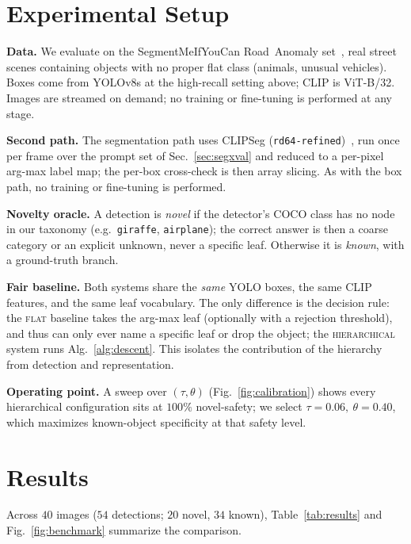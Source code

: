 \documentclass[conference]{IEEEtran}
\begin{document}
\section{Experimental Setup}
\label{sec:setup}

\textbf{Data.} We evaluate on the SegmentMeIfYouCan Road~Anomaly
set~\cite{chan2021}, real street scenes containing objects with no proper flat
class (animals, unusual vehicles). Boxes come from YOLOv8s at the high-recall
setting above; CLIP is ViT-B/32. Images are streamed on demand; no training or
fine-tuning is performed at any stage.

\textbf{Second path.} The segmentation path uses CLIPSeg
(\texttt{rd64-refined})~\cite{clipseg2022}, run once per frame over the prompt
set of Sec.~\ref{sec:segxval} and reduced to a per-pixel arg-max label map; the
per-box cross-check is then array slicing. As with the box path, no training or
fine-tuning is performed.

\textbf{Novelty oracle.} A detection is \emph{novel} if the detector's COCO class
has no node in our taxonomy (e.g.\ \texttt{giraffe}, \texttt{airplane}); the
correct answer is then a coarse category or an explicit unknown, never a specific
leaf. Otherwise it is \emph{known}, with a ground-truth branch.

\textbf{Fair baseline.} Both systems share the \emph{same} YOLO boxes, the same
CLIP features, and the same leaf vocabulary. The only difference is the decision
rule: the \textsc{flat} baseline takes the arg-max leaf (optionally with a
rejection threshold), and thus can only ever name a specific leaf or drop the
object; the \textsc{hierarchical} system runs Alg.~\ref{alg:descent}. This
isolates the contribution of the hierarchy from detection and representation.

\textbf{Operating point.} A sweep over $(\tau,\theta)$
(Fig.~\ref{fig:calibration}) shows every hierarchical configuration sits at
$100\%$ novel-safety; we select $\tau{=}0.06,\ \theta{=}0.40$, which maximizes
known-object specificity at that safety level.

\section{Results}
\label{sec:results}

Across $40$ images ($54$ detections; $20$ novel, $34$ known),
Table~\ref{tab:results} and Fig.~\ref{fig:benchmark} summarize the comparison.
\end{document}
